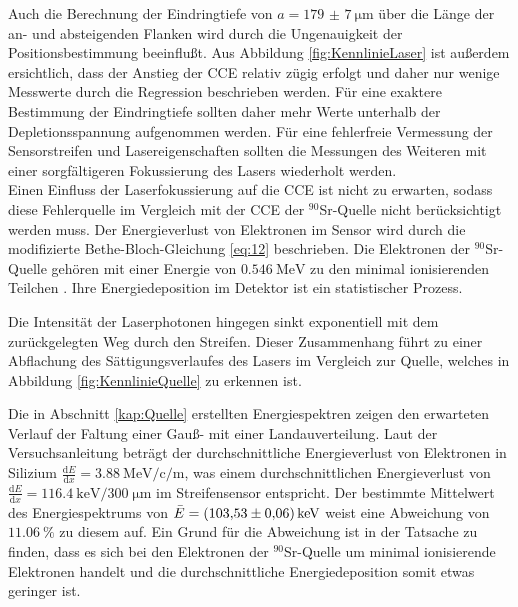 Auch die Berechnung der Eindringtiefe von $a= \SI{179(7)}{\micro\metre}$ über die Länge der an- und absteigenden Flanken wird durch die Ungenauigkeit der Positionsbestimmung beeinflußt.
Aus Abbildung \ref{fig:KennlinieLaser} ist außerdem ersichtlich, dass der Anstieg der CCE relativ zügig erfolgt und daher nur wenige Messwerte durch die Regression beschrieben werden. Für eine exaktere Bestimmung der Eindringtiefe sollten daher mehr Werte unterhalb der Depletionsspannung aufgenommen werden.
Für eine fehlerfreie Vermessung der Sensorstreifen und Lasereigenschaften sollten die Messungen des Weiteren mit einer sorgfältigeren Fokussierung des Lasers wiederholt werden.\\

Einen Einfluss der Laserfokussierung auf die CCE ist nicht zu erwarten, sodass diese Fehlerquelle im Vergleich mit der CCE der $^{90}$Sr-Quelle nicht berücksichtigt werden muss.
Der Energieverlust von Elektronen im Sensor wird durch die modifizierte Bethe-Bloch-Gleichung \ref{eq:12} beschrieben. Die Elektronen der $^{90}$Sr-Quelle gehören mit einer Energie von $\SI{0.546}{\mega\electronvolt}$ zu den minimal ionisierenden Teilchen \cite{periodensystem}. Ihre Energiedeposition im Detektor ist ein statistischer Prozess.
 
Die Intensität der Laserphotonen hingegen sinkt exponentiell mit dem zurückgelegten Weg durch den Streifen. Dieser Zusammenhang führt zu einer Abflachung des Sättigungsverlaufes des Lasers im Vergleich zur Quelle, welches in Abbildung \ref{fig:KennlinieQuelle} zu erkennen ist.

Die in Abschnitt \ref{kap:Quelle} erstellten Energiespektren zeigen den erwarteten Verlauf der Faltung einer Gauß- mit einer Landauverteilung. Laut der Versuchsanleitung \cite{anleitung} beträgt der durchschnittliche Energieverlust von Elektronen in Silizium $\frac{\mathrm{d}E}{\mathrm{d}x} = \SI{3.88}{\mega\electronvolt\per\centi \per \metre}$, was einem durchschnittlichen Energieverlust von $\frac{\mathrm{d}E}{\mathrm{d}x} = \SI{116.4}{\kilo\electronvolt\per 300\; \micro \metre}$ im Streifensensor entspricht. Der bestimmte Mittelwert des Energiespektrums von $\bar{E} = \SI{103.53 \pm 0.06}{\kilo\electronvolt}$ weist eine Abweichung von $\SI{11.06}{\%}$ zu diesem auf. Ein Grund für die Abweichung ist in der Tatsache zu finden, dass es sich bei den Elektronen der $^{90}$Sr-Quelle um minimal ionisierende Elektronen handelt und die durchschnittliche Energiedeposition somit etwas geringer ist. 
